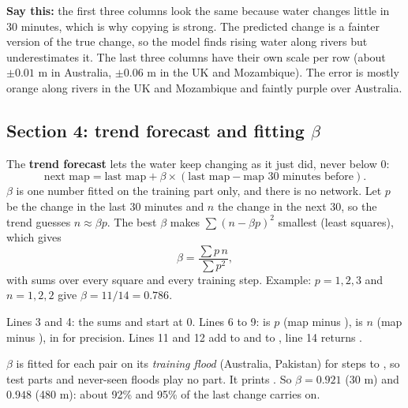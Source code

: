 \textbf{Say this:} the first three columns look the same because water changes little in 30 minutes, which is why copying is strong. The predicted change is a fainter version of the true change, so the model finds rising water along rivers but underestimates it. The last three columns have their own scale per row (about $\pm0.01$ m in Australia, $\pm0.06$ m in the UK and Mozambique). The error is mostly orange along rivers in the UK and Mozambique and faintly purple over Australia.

\subsection{Section 4: trend forecast and fitting $\beta$}

The \textbf{trend forecast} lets the water keep changing as it just did, never below 0:
\[\text{next map} = \text{last map} + \beta\times(\text{last map} - \text{map 30 minutes before}).\]
$\beta$ is one number fitted on the training part only, and there is no network. Let $p$ be the change in the last 30 minutes and $n$ the change in the next 30, so the trend guesses $n\approx\beta p$. The best $\beta$ makes $\sum(n-\beta p)^2$ smallest (least squares), which gives
\[ \beta = \frac{\sum p\, n}{\sum p^2}, \]
with sums over every square and every training step. Example: $p=1,2,3$ and $n=1,2,2$ give $\beta = 11/14 = 0.786$.


Lines 3 and 4: the sums  and  start at 0. Lines 6 to 9:  is $p$ (map  minus ),  is $n$ (map  minus ), in  for precision. Lines 11 and 12 add  to  and  to , line 14 returns .

$\beta$ is fitted for each pair on its \emph{training flood} (Australia, Pakistan) for steps  to , so test parts and never-seen floods play no part. It prints . So $\beta = 0.921$ (30 m) and $0.948$ (480 m): about 92\% and 95\% of the last change carries on. 

